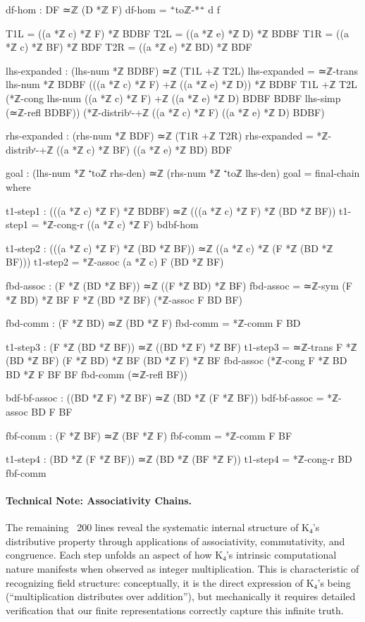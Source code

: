 \documentclass[11pt,a4paper]{book}
\begin{document}
\begin{code}
    df-hom : DF ≃ℤ (D *ℤ F)
    df-hom = ⁺toℤ-*⁺ d f

    T1L = ((a *ℤ c) *ℤ F) *ℤ BDBF
    T2L = ((a *ℤ e) *ℤ D) *ℤ BDBF
    T1R = ((a *ℤ c) *ℤ BF) *ℤ BDF
    T2R = ((a *ℤ e) *ℤ BD) *ℤ BDF

    lhs-expanded : (lhs-num *ℤ BDBF) ≃ℤ (T1L +ℤ T2L)
    lhs-expanded = ≃ℤ-trans {lhs-num *ℤ BDBF} 
                    {(((a *ℤ c) *ℤ F) +ℤ ((a *ℤ e) *ℤ D)) *ℤ BDBF}
                    {T1L +ℤ T2L}
                    (*ℤ-cong {lhs-num} {((a *ℤ c) *ℤ F) +ℤ ((a *ℤ e) *ℤ D)} 
                             {BDBF} {BDBF} lhs-simp (≃ℤ-refl BDBF))
                    (*ℤ-distribʳ-+ℤ ((a *ℤ c) *ℤ F) ((a *ℤ e) *ℤ D) BDBF)

    rhs-expanded : (rhs-num *ℤ BDF) ≃ℤ (T1R +ℤ T2R)
    rhs-expanded = *ℤ-distribʳ-+ℤ ((a *ℤ c) *ℤ BF) ((a *ℤ e) *ℤ BD) BDF

    goal : (lhs-num *ℤ ⁺toℤ rhs-den) ≃ℤ (rhs-num *ℤ ⁺toℤ lhs-den)
    goal = final-chain
      where
        
        t1-step1 : (((a *ℤ c) *ℤ F) *ℤ BDBF) ≃ℤ (((a *ℤ c) *ℤ F) *ℤ (BD *ℤ BF))
        t1-step1 = *ℤ-cong-r ((a *ℤ c) *ℤ F) bdbf-hom
        
        t1-step2 : (((a *ℤ c) *ℤ F) *ℤ (BD *ℤ BF)) ≃ℤ ((a *ℤ c) *ℤ (F *ℤ (BD *ℤ BF)))
        t1-step2 = *ℤ-assoc (a *ℤ c) F (BD *ℤ BF)
        
        fbd-assoc : (F *ℤ (BD *ℤ BF)) ≃ℤ ((F *ℤ BD) *ℤ BF)
        fbd-assoc = ≃ℤ-sym {(F *ℤ BD) *ℤ BF} {F *ℤ (BD *ℤ BF)} (*ℤ-assoc F BD BF)
        
        fbd-comm : (F *ℤ BD) ≃ℤ (BD *ℤ F)
        fbd-comm = *ℤ-comm F BD
        
        t1-step3 : (F *ℤ (BD *ℤ BF)) ≃ℤ ((BD *ℤ F) *ℤ BF)
        t1-step3 = ≃ℤ-trans {F *ℤ (BD *ℤ BF)} {(F *ℤ BD) *ℤ BF} {(BD *ℤ F) *ℤ BF}
                    fbd-assoc 
                    (*ℤ-cong {F *ℤ BD} {BD *ℤ F} {BF} {BF} fbd-comm (≃ℤ-refl BF))
        
        bdf-bf-assoc : ((BD *ℤ F) *ℤ BF) ≃ℤ (BD *ℤ (F *ℤ BF))
        bdf-bf-assoc = *ℤ-assoc BD F BF
        
        fbf-comm : (F *ℤ BF) ≃ℤ (BF *ℤ F)
        fbf-comm = *ℤ-comm F BF
        
        t1-step4 : (BD *ℤ (F *ℤ BF)) ≃ℤ (BD *ℤ (BF *ℤ F))
        t1-step4 = *ℤ-cong-r BD fbf-comm
\end{code}

\paragraph{Technical Note: Associativity Chains.}
The remaining ~200 lines reveal the systematic internal structure of K₄'s distributive property through applications of associativity, commutativity, and congruence. Each step unfolds an aspect of how K₄'s intrinsic computational nature manifests when observed as integer multiplication. This is characteristic of recognizing field structure: conceptually, it is the direct expression of K₄'s being (``multiplication distributes over addition''), but mechanically it requires detailed verification that our finite representations correctly capture this infinite truth.
\end{document}

